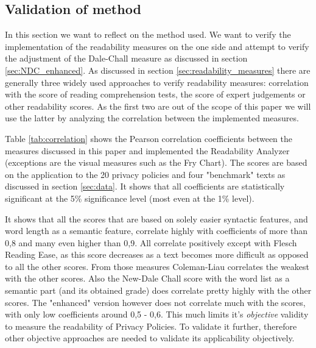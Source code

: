 \documentclass[runningheads,a4paper]{llncs}
\begin{document}
\subsection{Validation of method}\label{sec:validation}

In this section we want to reflect on the method used. We want to verify the implementation of the readability measures on the one side and attempt to verify the adjustment of the Dale-Chall measure as discussed in section \ref{sec:NDC_enhanced}. As discussed in section \ref{sec:readability_measures} there are generally three widely used approaches to verify readability measures: correlation with the score of reading comprehension tests, the score of expert judgements or other readability scores. As the first two are out of the scope of this paper we will use the latter by analyzing the correlation between the implemented measures. 

Table \ref{tab:correlation} shows the Pearson correlation coefficients between the measures discussed in this paper and implemented the Readability Analyzer (exceptions are the visual measures such as the Fry Chart). The scores are based on the application to the 20 privacy policies and four "benchmark" texts as discussed in section \ref{sec:data}. It shows that all coefficients are statistically significant at the 5\% significance level (most even at the 1\% level).

It shows that all the scores that are based on solely easier syntactic features, and word length as a semantic feature, correlate highly with coefficients of more than 0,8 and many even higher than 0,9. All correlate positively except with Flesch Reading Ease, as this score decreases as a text becomes more difficult as opposed to all the other scores. From those measures Coleman-Liau correlates the weakest with the other scores. Also the New-Dale Chall score with the word list as a semantic part (and its obtained grade) does correlate pretty highly with the other scores. The "enhanced" version however does not correlate much with the scores, with only low coefficients around 0,5 - 0,6. This much limits it's \emph{objective} validity to measure the readability of Privacy Policies. To validate it further, therefore other objective approaches are needed to validate its applicability objectively.
\end{document}
